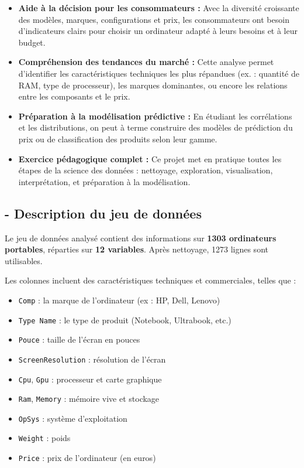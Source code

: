 \documentclass[12pt]{report}
\begin{document}
\begin{itemize}
    \item \textbf{Aide à la décision pour les consommateurs :} Avec la diversité croissante des modèles, marques, configurations et prix, les consommateurs ont besoin d'indicateurs clairs pour choisir un ordinateur adapté à leurs besoins et à leur budget.
    
    \item \textbf{Compréhension des tendances du marché :} Cette analyse permet d'identifier les caractéristiques techniques les plus répandues (ex. : quantité de RAM, type de processeur), les marques dominantes, ou encore les relations entre les composants et le prix.
    
    \item \textbf{Préparation à la modélisation prédictive :} En étudiant les corrélations et les distributions, on peut à terme construire des modèles de prédiction du prix ou de classification des produits selon leur gamme.
    
    \item \textbf{Exercice pédagogique complet :} Ce projet met en pratique toutes les étapes de la science des données : nettoyage, exploration, visualisation, interprétation, et préparation à la modélisation.
\end{itemize}

\subsection*{- Description du jeu de données}

Le jeu de données analysé contient des informations sur \textbf{1303 ordinateurs portables}, réparties sur \textbf{12 variables}. Après nettoyage, 1273 lignes sont utilisables.

Les colonnes incluent des caractéristiques techniques et commerciales, telles que :

\begin{itemize}
    \item \texttt{Comp} : la marque de l'ordinateur (ex : HP, Dell, Lenovo)
    \item \texttt{Type Name} : le type de produit (Notebook, Ultrabook, etc.)
    \item \texttt{Pouce} : taille de l’écran en pouces
    \item \texttt{ScreenResolution} : résolution de l’écran
    \item \texttt{Cpu}, \texttt{Gpu} : processeur et carte graphique
    \item \texttt{Ram}, \texttt{Memory} : mémoire vive et stockage
    \item \texttt{OpSys} : système d’exploitation
    \item \texttt{Weight} : poids
    \item \texttt{Price} : prix de l’ordinateur (en euros)
\end{itemize}
\end{document}
